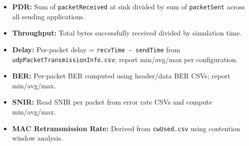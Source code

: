 \documentclass{article}
\begin{document}
\begin{itemize}

  \item \textbf{PDR:} Sum of \texttt{packetReceived} at sink divided by sum of \texttt{packetSent} across all sending applications.

  \item \textbf{Throughput:} Total bytes successfully received divided by simulation time.

  \item \textbf{Delay:} Per-packet delay = \texttt{recvTime - sendTime} from \texttt{udpPacketTransmissionInfo.csv}; report min/avg/max per configuration.

  \item \textbf{BER:} Per-packet BER computed using header/data BER CSVs; report min/avg/max.

  \item \textbf{SNIR:} Read SNIR per packet from error rate CSVs and compute min/avg/max.

  \item \textbf{MAC Retransmission Rate:} Derived from \texttt{cwUsed.csv} using contention window analysis.

\end{itemize}
\end{document}
